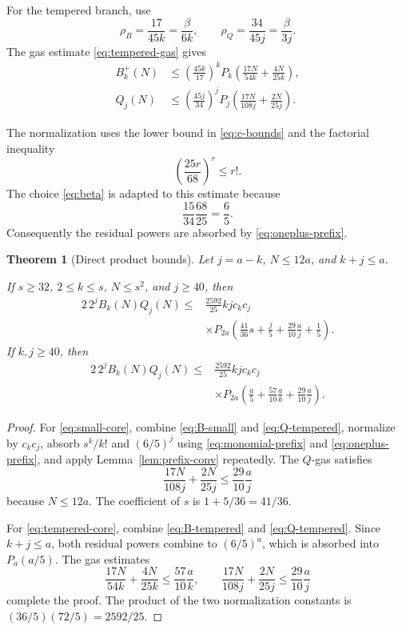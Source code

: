 \documentclass[11pt]{article}
\newtheorem{theorem}{Theorem}[section]
\theoremstyle{definition}
\theoremstyle{remark}
\begin{document}
For the tempered branch, use
\[
 \rho_B=\frac{17}{45k}=\frac{\beta}{6k},
 \qquad
 \rho_Q=\frac{34}{45j}=\frac{\beta}{3j}.
\]
The gas estimate \eqref{eq:tempered-gas} gives
\begin{align}
 B_k^+(N)&\le\left(\frac{45k}{17}\right)^k
 P_k\left(\frac{17N}{54k}+\frac{4N}{25k}\right),
 \label{eq:B-tempered}\\
 Q_j(N)&\le\left(\frac{45j}{34}\right)^j
 P_j\left(\frac{17N}{108j}+\frac{2N}{25j}\right).
 \label{eq:Q-tempered}
\end{align}

The normalization uses the lower bound in \eqref{eq:c-bounds} and the
factorial inequality
\begin{equation}\label{eq:factorial-lb}
  \left(\frac{25r}{68}\right)^r\le r!.
\end{equation}
The choice \eqref{eq:beta} is adapted to this estimate because
\[
  \frac{15}{34}\frac{68}{25}=\frac65.
\]
Consequently the residual powers are absorbed by
\eqref{eq:oneplus-prefix}.

\begin{theorem}[Direct product bounds]\label{thm:direct-product}
Let $j=a-k$, $N\le12a$, and $k+j\le a$.

If $s\ge32$, $2\le k\le s$, $N\le s^2$, and $j\ge40$, then
\begin{equation}\label{eq:small-core}
\begin{split}
 2\,2^j B_k(N)Q_j(N)
 \le{}&\frac{2592}{25}kjc_kc_j\\
 &\times P_{2a}\left(
 \frac{41}{36}s+\frac j5+
 \frac{29}{10}\frac aj+\frac15\right).
\end{split}
\end{equation}
If $k,j\ge40$, then
\begin{equation}\label{eq:tempered-core}
\begin{split}
 2\,2^j B_k(N)Q_j(N)
 \le{}&\frac{2592}{25}kjc_kc_j\\
 &\times P_{2a}\left(
 \frac a5+\frac{57}{10}\frac ak+
 \frac{29}{10}\frac aj\right).
\end{split}
\end{equation}
\end{theorem}

\begin{proof}
For \eqref{eq:small-core}, combine \eqref{eq:B-small} and
\eqref{eq:Q-tempered}, normalize by $c_kc_j$, absorb $s^k/k!$ and
$(6/5)^j$ using \eqref{eq:monomial-prefix} and
\eqref{eq:oneplus-prefix}, and apply Lemma~\ref{lem:prefix-conv} repeatedly.
The $Q$-gas satisfies
\[
 \frac{17N}{108j}+\frac{2N}{25j}
 \le\frac{29}{10}\frac aj
\]
because $N\le12a$.  The coefficient of $s$ is
$1+5/36=41/36$.

For \eqref{eq:tempered-core}, combine \eqref{eq:B-tempered} and
\eqref{eq:Q-tempered}.  Since $k+j\le a$, both residual powers combine to
$(6/5)^a$, which is absorbed into $P_a(a/5)$.  The gas estimates
\[
 \frac{17N}{54k}+\frac{4N}{25k}
 \le\frac{57}{10}\frac ak,
 \qquad
 \frac{17N}{108j}+\frac{2N}{25j}
 \le\frac{29}{10}\frac aj
\]
complete the proof.  The product of the two normalization constants is
$(36/5)(72/5)=2592/25$.
\end{proof}
\end{document}
